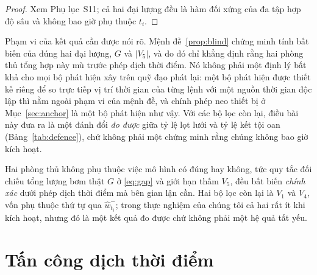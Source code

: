 \begin{proof}
Xem Phụ lục~S11; cả hai đại lượng đều là hàm đối xứng của đa tập hợp độ sâu và
không bao giờ phụ thuộc $t_i$.
\end{proof}

Phạm vi của kết quả cần được nói rõ. Mệnh đề~\ref{prop:blind} chứng minh tính
bất biến của đúng hai đại lượng, $G$ và $|V_5|$, và do đó chỉ khẳng định rằng hai
phòng thủ tổng hợp này mù trước phép dịch thời điểm. Nó không phải một định lý bất
khả cho mọi bộ phát hiện xây trên quỹ đạo phát lại: một bộ phát hiện được thiết kế
riêng để so trực tiếp vị trí thời gian của từng lệnh với một nguồn thời gian độc lập
thì nằm ngoài phạm vi của mệnh đề, và chính phép neo thiết bị ở Mục~\ref{sec:anchor}
là một bộ phát hiện như vậy. Với các bộ lọc còn lại, điều bài này đưa ra là một đánh
đổi \emph{đo được} giữa tỷ lệ lọt lưới và tỷ lệ kết tội oan
(Bảng~\ref{tab:defence}), chứ không phải một chứng minh rằng chúng không bao giờ
kích hoạt.

Hai phòng thủ không phụ thuộc việc mô hình có đúng hay không, tức quy tắc đối chiếu
tổng lượng bơm thật $G$ ở \eqref{eq:gap} và giới hạn thấm $V_5$, đều bất biến
\emph{chính xác} dưới phép dịch thời điểm mà bên gian lận cần. Hai bộ lọc còn lại là
$V_1$ và $V_4$, vốn phụ thuộc thứ tự qua $\hat w_{t_i}^{-}$; trong thực nghiệm
của chúng tôi cả hai rất ít khi kích hoạt, nhưng đó là một kết quả đo được chứ không
phải một hệ quả tất yếu.

\section{Tấn công dịch thời điểm}
\label{sec:timeshift}

